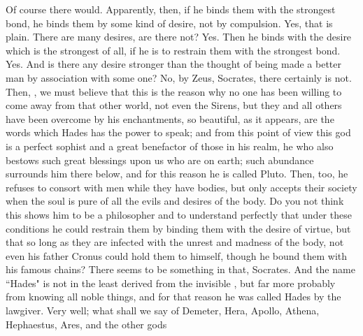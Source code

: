 {\hermogenesspeaks
Of course there would.
\socratesspeaks
Apparently, then, if he binds them with the strongest bond, he binds them by some kind of desire, not by compulsion.
\hermogenesspeaks
Yes, that is plain.
\socratesspeaks
There are many desires, are there not?
\hermogenesspeaks
Yes. 
\socratesspeaks
Then he binds with the desire which is the strongest of all, if he is to restrain them with the strongest bond.
\hermogenesspeaks
Yes.
\socratesspeaks
And is there any desire stronger than the thought of being made a better man by association with some one?
\hermogenesspeaks
No, by Zeus, Socrates, there certainly is not.
\socratesspeaks
Then, \hermogenesspeaks, we must believe that this is the reason why no one has been willing to come away from that other world, not even the Sirens, but they and all others have been overcome by his enchantments,  so beautiful, as it appears, are the words which Hades has the power to speak; and from this point of view this god is a perfect sophist and a great benefactor of those in his realm, he who also bestows such great blessings upon us who are on earth; such abundance surrounds him there below, and for this reason he is called Pluto. Then, too, he refuses to consort with men while they have bodies, but only accepts their society  when the soul is pure of all the evils and desires of the body. Do you not think this shows him to be a philosopher and to understand perfectly that under these conditions he could restrain them by binding them with the desire of virtue, but that so long as they are infected with the unrest and madness of the body, not even his father Cronus could hold them to himself, though he bound them with his famous chains?
\hermogenesspeaks
There seems to be something in that, Socrates. 
\socratesspeaks
And the name ``Hades" is not in the least derived from the invisible , but far more probably from knowing  all noble things, and for that reason he was called Hades by the lawgiver.
\hermogenesspeaks
Very well; what shall we say of Demeter, Hera, Apollo, Athena, Hephaestus, Ares, and the other gods
\socratesspeaks
}
